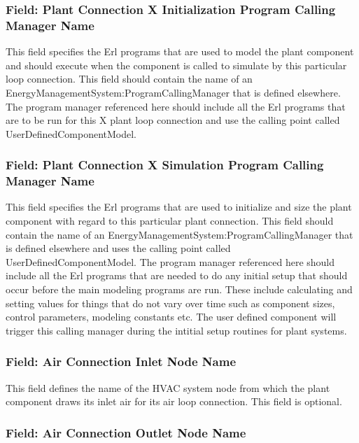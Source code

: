 \subsubsection{Field: Plant Connection X Initialization Program Calling Manager Name}\label{field-plant-connection-x-initialization-program-calling-manager-name}

This field specifies the Erl programs that are used to model the plant component and should execute when the component is called to simulate by this particular loop connection. This field should contain the name of an EnergyManagementSystem:ProgramCallingManager that is defined elsewhere. The program manager referenced here should include all the Erl programs that are to be run for this X plant loop connection and use the calling point called UserDefinedComponentModel.

\subsubsection{Field: Plant Connection X Simulation Program Calling Manager Name}\label{field-plant-connection-x-simulation-program-calling-manager-name}

This field specifies the Erl programs that are used to initialize and size the plant component with regard to this particular plant connection. This field should contain the name of an EnergyManagementSystem:ProgramCallingManager that is defined elsewhere and uses the calling point called UserDefinedComponentModel. The program manager referenced here should include all the Erl programs that are needed to do any initial setup that should occur before the main modeling programs are run. These include calculating and setting values for things that do not vary over time such as component sizes, control parameters, modeling constants etc. The user defined component will trigger this calling manager during the intitial setup routines for plant systems.

\subsubsection{Field: Air Connection Inlet Node Name}\label{field-air-connection-inlet-node-name}

This field defines the name of the HVAC system node from which the plant component draws its inlet air for its air loop connection. This field is optional.

\subsubsection{Field: Air Connection Outlet Node Name}\label{field-air-connection-outlet-node-name}

